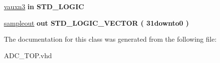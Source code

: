\begin{DoxyCompactItemize}
\item 
\hypertarget{class_a_d_c___t_o_p_a2debc752f658b0d0d0c11dbe8b62d184}{\hyperlink{class_a_d_c___t_o_p_a2debc752f658b0d0d0c11dbe8b62d184}{vauxn3}  {\bfseries {\bfseries \textcolor{vhdlkeyword}{in}\textcolor{vhdlchar}{ }}} {\bfseries \textcolor{comment}{S\-T\-D\-\_\-\-L\-O\-G\-I\-C}\textcolor{vhdlchar}{ }} }\label{class_a_d_c___t_o_p_a2debc752f658b0d0d0c11dbe8b62d184}

\item 
\hypertarget{class_a_d_c___t_o_p_acff8579331580bc8cf5ddf203664d0f2}{\hyperlink{class_a_d_c___t_o_p_acff8579331580bc8cf5ddf203664d0f2}{sampleout}  {\bfseries {\bfseries \textcolor{vhdlkeyword}{out}\textcolor{vhdlchar}{ }}} {\bfseries \textcolor{comment}{S\-T\-D\-\_\-\-L\-O\-G\-I\-C\-\_\-\-V\-E\-C\-T\-O\-R}\textcolor{vhdlchar}{ }\textcolor{vhdlchar}{(}\textcolor{vhdlchar}{ }\textcolor{vhdlchar}{31downto0}\textcolor{vhdlchar}{ }\textcolor{vhdlchar}{)}\textcolor{vhdlchar}{ }} }\label{class_a_d_c___t_o_p_acff8579331580bc8cf5ddf203664d0f2}

\end{DoxyCompactItemize}


The documentation for this class was generated from the following file\-:\begin{DoxyCompactItemize}
\item 
A\-D\-C\-\_\-\-T\-O\-P.\-vhd\end{DoxyCompactItemize}
